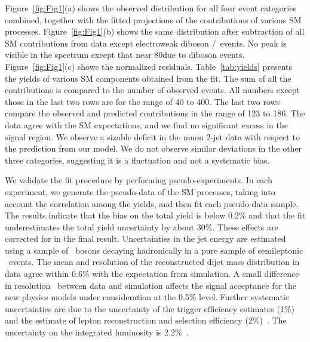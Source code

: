 Figure~\ref{fig:Fig1}(a) shows the observed \mjj distribution for all
four event categories combined, together with the fitted projections of the
contributions of various SM processes.  Figure~\ref{fig:Fig1}(b) shows
the same distribution after subtraction of all SM contributions from
data except electroweak diboson \PW\PW/\PW\PZ\ events.  No peak is visible in
the spectrum except that near 80\GeV due to diboson events.
Figure~\ref{fig:Fig1}(c) shows the normalized residuals.
Table~\ref{tab:yields} presents the yields of various SM components
obtained from the fit.  The sum of all the contributions is compared
to the number of observed events.  All numbers except those in the last
two rows are for the \mjj range of 40 to 400\GeV.  The last two rows
compare the observed and predicted contributions in the \mjj range of
123 to 186\GeV.  The data agree with the SM expectations, and we find
no significant excess in the signal region. We observe a sizable deficit
in the muon 2-jet data with respect to the prediction from our model.
We do not observe similar deviations in the other three categories,
suggesting it is a fluctuation and not a systematic bias.



We validate the fit procedure by performing pseudo-experiments.  In
each experiment, we generate the \mjj pseudo-data of the SM processes,
taking into account the correlation among the yields, and then fit
each pseudo-data sample.  The results indicate that the bias on the
total yield is below 0.2\% and that the fit underestimates the total
yield uncertainty by about 30\%.  These effects are corrected for in
the final result.  Uncertainties in the jet energy are estimated using
a sample of \PW\ bosons decaying hadronically in a pure sample of
semileptonic \ttbar\ events.  The mean and resolution of the
reconstructed dijet mass distribution in data agree within 0.6\% with
the expectation from simulation.  A small difference in \met
resolution~\cite{Chatrchyan:2011tn} between data and simulation
affects the signal acceptance for the new physics models under
consideration at the 0.5\% level.  Further systematic uncertainties
are due to the uncertainty of the trigger efficiency estimates (1\%)
and the estimate of lepton reconstruction and selection efficiency
(2\%)~\cite{WZCMS:2010}.  The uncertainty on the integrated luminosity
is 2.2\%~\cite{lumiPAS}.
 
